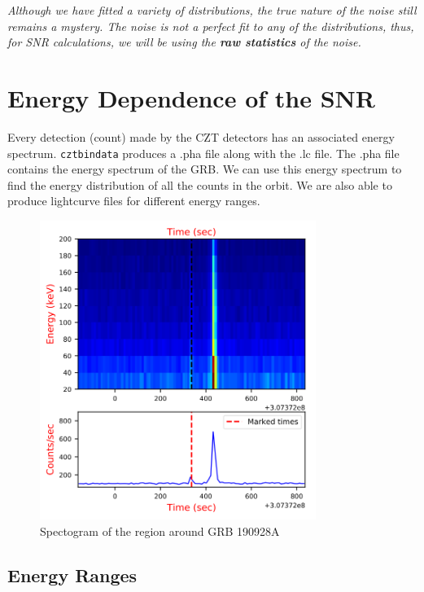 \documentclass[11pt]{book} %
\begin{document}
\vfill

\textsl{Although we have fitted a variety of distributions, the true nature of the noise still remains a mystery. The noise is not a perfect fit to any of the distributions, thus, for SNR calculations, we will be using the \textbf{raw statistics} of the noise.}
\newpage 

\section{Energy Dependence of the SNR}

Every detection (count) made by the CZT detectors has an associated energy spectrum. \lstinline[language=Python]{cztbindata} produces a .pha file along with the .lc file. The .pha file contains the energy spectrum of the GRB. We can use this energy spectrum to find the energy distribution of all the counts in the orbit. We are also able to produce lightcurve files for different energy ranges.

\begin{figure}[H]
    \centering
    \includegraphics[width=0.8\textwidth]{Pictures/spectogram.png}
    \caption{Spectogram of the region around GRB 190928A}
\end{figure}

\subsection{Energy Ranges}
\end{document}
